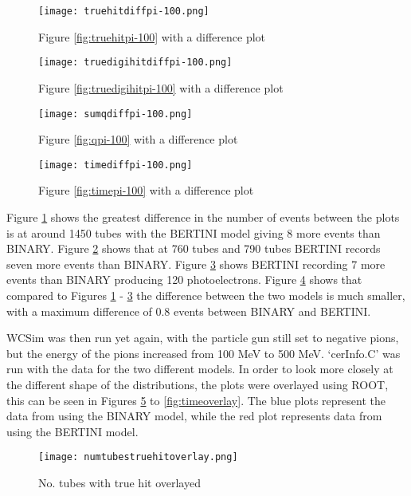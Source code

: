 \documentclass[11pt,oneside,a4paper]{article}
\begin{document}
\begin{figure}
	\centering
	\texttt{[image: truehitdiffpi-100.png]}
	\caption{Figure \ref{fig:truehitpi-100} with a difference plot}
	\label{fig:truehitdiffpi-100}
\end{figure}

\begin{figure}
	\centering
	\texttt{[image: truedigihitdiffpi-100.png]}
	\caption{Figure \ref{fig:truedigihitpi-100} with a difference plot}
	\label{fig:truedigihitdiffpi-100}
\end{figure}

\begin{figure}
	\centering
	\texttt{[image: sumqdiffpi-100.png]}
	\caption{Figure \ref{fig:qpi-100} with a difference plot}
	\label{fig:sumqdiffpi-100}
\end{figure}


\begin{figure}
	\centering
	\texttt{[image: timediffpi-100.png]}
	\caption{Figure \ref{fig:timepi-100} with a difference plot}
	\label{fig:timediffpi-100}
\end{figure}

Figure \ref{fig:truehitdiffpi-100} shows the greatest difference in the number of events between the plots is at around 1450 tubes with the BERTINI model giving 8 more events than BINARY. Figure \ref{fig:truedigihitdiffpi-100} shows that at 760 tubes and 790 tubes BERTINI records seven more events than BINARY. Figure \ref{fig:sumqdiffpi-100} shows BERTINI recording 7 more events than BINARY producing 120 photoelectrons. Figure \ref{fig:timediffpi-100} shows that compared to Figures \ref{fig:truehitdiffpi-100} - \ref{fig:sumqdiffpi-100} the difference between the two models is much smaller, with a maximum difference of 0.8 events between BINARY and BERTINI.


WCSim was then run yet again, with the particle gun still set to negative pions, but the energy of the pions increased from 100 MeV to 500 MeV. `cerInfo.C' was run with the data for the two different models. In order to look more closely at the different shape of the distributions, the plots were overlayed using ROOT, this can be seen in Figures \ref{fig:hitoverlay} to \ref{fig:timeoverlay}. The blue plots represent the data from using the BINARY model, while the red plot represents data from using the BERTINI model.

\begin{figure}
		\centering
		\captionsetup{justification=centering}
		\texttt{[image: numtubestruehitoverlay.png]}
		\caption{No. tubes with true hit overlayed}
		\label{fig:hitoverlay}
	\end{figure}
\end{document}
